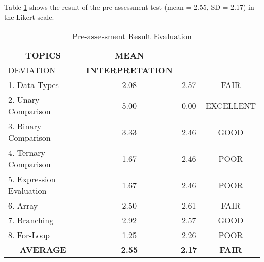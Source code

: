 \parx
Table \ref{table:pre_result_scale} shows the result of the pre-assessment test
(mean = 2.55, SD = 2.17) in the Likert scale.

\begin{longtable}[c]{lccc}
\caption{Pre-assessment Result Evaluation}
\label{table:pre_result_scale}\\ \hline
\multicolumn{1}{c}{\textbf{TOPICS}} & \textbf{MEAN} & \textbf{\begin{tabular}[c]{@{}c@{}}STANDARD\\ DEVIATION\end{tabular}} & \textbf{INTERPRETATION} \\ \hline
\endfirsthead
%
\endhead
%
1. Data Types                        & 2.08          & 2.57                                                                  & FAIR                    \\
2. Unary Comparison                  & 5.00             & 0.00                                                                     & EXCELLENT               \\
3. Binary Comparison                 & 3.33          & 2.46                                                                  & GOOD                    \\
4. Ternary Comparison                & 1.67          & 2.46                                                                  & POOR                    \\
5. Expression Evaluation             & 1.67          & 2.46                                                                  & POOR                    \\
6. Array                             & 2.50           & 2.61                                                                  & FAIR                    \\
7. Branching                         & 2.92          & 2.57                                                                  & GOOD                    \\
8. For-Loop                         & 1.25          & 2.26                                                                  & POOR                    \\
\multicolumn{1}{c}{\textbf{AVERAGE}} & \textbf{2.55} & \textbf{2.17}                                                         & \textbf{FAIR}          \\ \hline
\end{longtable}
